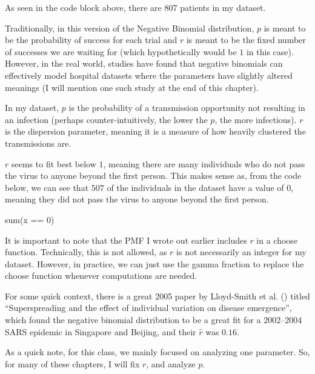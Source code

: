 \documentclass[
  letterpaper,
  DIV=11,
  numbers=noendperiod]{scrreprt}
\newenvironment{Shaded}{\begin{snugshade}}{\end{snugshade}}
\newcommand{\NormalTok}[1]{\textcolor[rgb]{0.00,0.23,0.31}{#1}}
\begin{document}
As seen in the code block above, there are 807 patients in my dataset.

Traditionally, in this version of the Negative Binomial distribution,
\(p\) is meant to be the probability of success for each trial and \(r\)
is meant to be the fixed number of successes we are waiting for (which
hypothetically would be \(1\) in this case). However, in the real world,
studies have found that negative binomials can effectively model
hospital datasets where the parameters have slightly altered meanings (I
will mention one such study at the end of this chapter).

In my dataset, \(p\) is the probability of a transmission opportunity
not resulting in an infection (perhaps counter-intuitively, the lower
the \(p\), the more infectious). \(r\) is the dispersion parameter,
meaning it is a measure of how heavily clustered the transmissions are.

\(r\) seems to fit best below \(1\), meaning there are many individuals
who do not pass the virus to anyone beyond the first person. This makes
sense as, from the code below, we can see that \(507\) of the
individuals in the dataset have a value of \(0\), meaning they did not
pass the virus to anyone beyond the first person.

\begin{Shaded}
\begin{Highlighting}[]
\NormalTok{sum(x == 0)}
\end{Highlighting}
\end{Shaded}

It is important to note that the PMF I wrote out earlier includes \(r\)
in a choose function. Technically, this is not allowed, as \(r\) is not
necessarily an integer for my dataset. However, in practice, we can just
use the gamma fraction to replace the choose function whenever
computations are needed.

For some quick context, there is a great 2005 paper by Lloyd-Smith et
al. () titled ``Superspreading and
the effect of individual variation on disease emergence'', which found
the negative binomial distribution to be a great fit for a 2002--2004
SARS epidemic in Singapore and Beijing, and their \(\hat{r}\) was
\(0.16\).

As a quick note, for this class, we mainly focused on analyzing one
parameter. So, for many of these chapters, I will fix \(r\), and analyze
\(p\).

\end{document}
